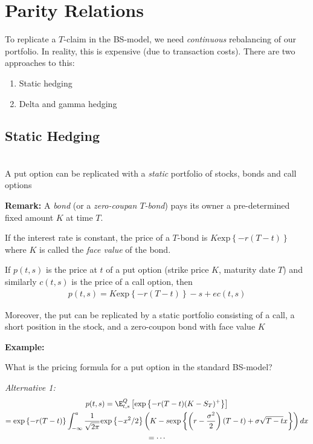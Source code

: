\section{Parity Relations}
To replicate a $T$-claim in the BS-model, we need \textit{continuous} rebalancing of our portfolio. In reality, this is expensive (due to transaction costs). There are two approaches to this:\par
\begin{enumerate}[leftmargin=*]
  \item Static hedging
  \item Delta and gamma hedging
\end{enumerate}
\par\bigskip
\subsection{Static Hedging}\hfill\\
A put option can be replicated with a \textit{static} portfolio of stocks, bonds and call options
\par\bigskip
\noindent\textbf{Remark:} A \textit{bond} (or a \textit{zero-coupan $T$-bond}) pays its owner a pre-determined fixed amount $K$ at time $T$.\par
\noindent If the interest rate is constant, the price of a $T$-bond is $K\text{exp}\left\{-r(T-t)\right\}$ where $K$ is called the \textit{face value} of the bond.
\par\bigskip
\begin{lem}{}
  If $p(t,s)$ is the price at $t$ of a put option (strike price $K$, maturity date $T$) and similarly $c(t,s)$ is the price of a call option, then
  \begin{equation*}
    \begin{gathered}
      p(t,s) = K\text{exp}\left\{-r(T-t)\right\}-s+ec(t,s)
    \end{gathered}
  \end{equation*}\par
  \noindent Moreover, the put can be replicated by a static portfolio consisting of a call, a short position in the stock, and a zero-coupon bond with face value $K$
\end{lem}
\par\bigskip
\noindent\textbf{Example:}\par
\noindent What is the pricing formula for a put option in the standard BS-model?\par
\noindent\textit{Alternative 1:}
\begin{equation*}
  \begin{gathered}
    p(t,s) = \E_{t,s}^Q\left[\text{exp}\left\{-r(T-t)(K-S_T)^+\right\}\right]\\
    = \text{exp}\left\{-r(T-t)\right\}\int_{-\infty}^{a}\dfrac{1}{\sqrt{2\pi}}\text{exp}\left\{-x^2/2\right\}\left(K-s\text{exp}\left\{\left(r-\dfrac{\sigma^2}{2}\right)(T-t)+\sigma\sqrt{T-t}x\right\}\right)dx\\
    = \cdots
  \end{gathered}
\end{equation*}
